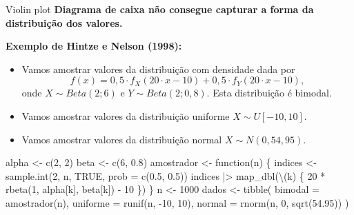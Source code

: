 \documentclass[
  10pt,
  ignorenonframetext,
]{beamer}
\newenvironment{Shaded}{\begin{snugshade}}{\end{snugshade}}
\newcommand{\AttributeTok}[1]{\textcolor[rgb]{0.40,0.45,0.13}{#1}}
\newcommand{\ConstantTok}[1]{\textcolor[rgb]{0.56,0.35,0.01}{#1}}
\newcommand{\ControlFlowTok}[1]{\textcolor[rgb]{0.00,0.23,0.31}{#1}}
\newcommand{\DecValTok}[1]{\textcolor[rgb]{0.68,0.00,0.00}{#1}}
\newcommand{\FloatTok}[1]{\textcolor[rgb]{0.68,0.00,0.00}{#1}}
\newcommand{\FunctionTok}[1]{\textcolor[rgb]{0.28,0.35,0.67}{#1}}
\newcommand{\NormalTok}[1]{\textcolor[rgb]{0.00,0.23,0.31}{#1}}
\newcommand{\OtherTok}[1]{\textcolor[rgb]{0.00,0.23,0.31}{#1}}
\newcommand{\SpecialCharTok}[1]{\textcolor[rgb]{0.37,0.37,0.37}{#1}}
\providecommand{\tightlist}{%
  \setlength{\itemsep}{0pt}\setlength{\parskip}{0pt}}\usepackage{longtable,booktabs,array}
\begin{document}
\begin{frame}{Violin plot}
\protect\hypertarget{violin-plot-2}{}
\textbf{Diagrama de caixa não consegue capturar a forma da distribuição
dos valores.}

\textbf{Exemplo de Hintze e Nelson (1998):}

\begin{itemize}
\tightlist
\item
  Vamos amostrar valores da distribuição com densidade dada por
  \[f(x) = 0,5 \cdot  f_X(20\cdot x - 10) + 0,5 \cdot f_Y(20\cdot x - 10),\]
  onde \(X\sim Beta(2; 6)\) e \(Y\sim Beta(2; 0,8)\). Esta distribuição
  é bimodal.
\item
  Vamos amostrar valores da distribuição uniforme \(X \sim U[-10, 10]\).
\item
  Vamos amostrar valores da distribuição normal \(X \sim N(0, 54,95)\).
\end{itemize}
\end{frame}

\begin{frame}[fragile]
\begin{Shaded}
\begin{Highlighting}[]
\NormalTok{alpha }\OtherTok{\textless{}{-}} \FunctionTok{c}\NormalTok{(}\DecValTok{2}\NormalTok{, }\DecValTok{2}\NormalTok{)}
\NormalTok{beta }\OtherTok{\textless{}{-}} \FunctionTok{c}\NormalTok{(}\DecValTok{6}\NormalTok{, }\FloatTok{0.8}\NormalTok{)}
\NormalTok{amostrador }\OtherTok{\textless{}{-}} \ControlFlowTok{function}\NormalTok{(n) \{}
\NormalTok{  indices }\OtherTok{\textless{}{-}} \FunctionTok{sample.int}\NormalTok{(}\DecValTok{2}\NormalTok{, n, }\ConstantTok{TRUE}\NormalTok{, }\AttributeTok{prob =} \FunctionTok{c}\NormalTok{(}\FloatTok{0.5}\NormalTok{, }\FloatTok{0.5}\NormalTok{))}
\NormalTok{  indices }\SpecialCharTok{|\textgreater{}} \FunctionTok{map\_dbl}\NormalTok{(\textbackslash{}(k) \{}
    \DecValTok{20} \SpecialCharTok{*} \FunctionTok{rbeta}\NormalTok{(}\DecValTok{1}\NormalTok{, alpha[k], beta[k]) }\SpecialCharTok{{-}} \DecValTok{10}
\NormalTok{  \})}
\NormalTok{\}}
\NormalTok{n }\OtherTok{\textless{}{-}} \DecValTok{1000}
\NormalTok{dados }\OtherTok{\textless{}{-}} \FunctionTok{tibble}\NormalTok{(}
  \AttributeTok{bimodal =} \FunctionTok{amostrador}\NormalTok{(n),}
  \AttributeTok{uniforme =} \FunctionTok{runif}\NormalTok{(n, }\SpecialCharTok{{-}}\DecValTok{10}\NormalTok{, }\DecValTok{10}\NormalTok{),}
  \AttributeTok{normal =} \FunctionTok{rnorm}\NormalTok{(n, }\DecValTok{0}\NormalTok{, }\FunctionTok{sqrt}\NormalTok{(}\FloatTok{54.95}\NormalTok{))}
\NormalTok{)}
\end{Highlighting}
\end{Shaded}
\end{frame}
\end{document}
